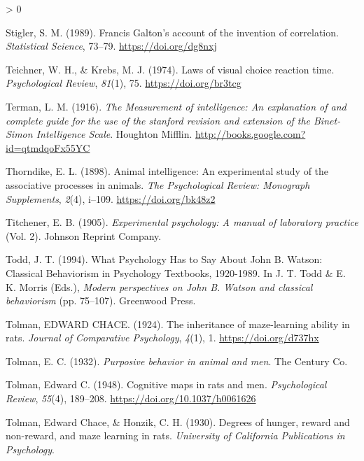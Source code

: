 \documentclass[
  oneside,
  12pt]{crumpbook}
\newlength{\cslhangindent}
\newenvironment{CSLReferences}[2] %
 {%
  \setlength{\parindent}{0pt}
  \ifodd #1 \everypar{\setlength{\hangindent}{\cslhangindent}}\ignorespaces\fi
  \ifnum #2 > 0
  \setlength{\parskip}{#2\baselineskip}
  \fi
 }%
 {}
\begin{document}
\begin{CSLReferences}{1}{0}
\leavevmode\hypertarget{ref-stiglerFrancisGaltonAccount1989}{}%
Stigler, S. M. (1989). Francis {Galton}'s account of the invention of correlation. \emph{Statistical Science}, 73--79. \url{https://doi.org/dg8nxj}

\leavevmode\hypertarget{ref-teichnerLawsVisualChoice1974}{}%
Teichner, W. H., \& Krebs, M. J. (1974). Laws of visual choice reaction time. \emph{Psychological Review}, \emph{81}(1), 75. \url{https://doi.org/br3tcg}

\leavevmode\hypertarget{ref-termanMeasurementIntelligenceExplanation1916}{}%
Terman, L. M. (1916). \emph{The {Measurement} of intelligence: {An} explanation of and complete guide for the use of the stanford revision and extension of the {Binet}-{Simon Intelligence Scale}}. {Houghton Mifflin}. \url{http://books.google.com?id=qtmdqoFx55YC}

\leavevmode\hypertarget{ref-thorndikeAnimalIntelligenceExperimental1898}{}%
Thorndike, E. L. (1898). Animal intelligence: {An} experimental study of the associative processes in animals. \emph{The Psychological Review: Monograph Supplements}, \emph{2}(4), i--109. \url{https://doi.org/bk48z2}

\leavevmode\hypertarget{ref-titchenerExperimentalPsychologyManual1905}{}%
Titchener, E. B. (1905). \emph{Experimental psychology: {A} manual of laboratory practice} (Vol. 2). {Johnson Reprint Company}.

\leavevmode\hypertarget{ref-toddWhatPsychologyHas1994}{}%
Todd, J. T. (1994). What {Psychology Has} to {Say About John B}. {Watson}: {Classical Behaviorism} in {Psychology Textbooks}, 1920-1989. In J. T. Todd \& E. K. Morris (Eds.), \emph{Modern perspectives on {John B}. {Watson} and classical behaviorism} (pp. 75--107). {Greenwood Press}.

\leavevmode\hypertarget{ref-tolmanInheritanceMazelearningAbility1924}{}%
Tolman, EDWARD CHACE. (1924). The inheritance of maze-learning ability in rats. \emph{Journal of Comparative Psychology}, \emph{4}(1), 1. \url{https://doi.org/d737hx}

\leavevmode\hypertarget{ref-tolmanPurposiveBehaviorAnimal1932}{}%
Tolman, E. C. (1932). \emph{Purposive behavior in animal and men}. {The Century Co.}

\leavevmode\hypertarget{ref-tolmanCognitiveMapsRats1948}{}%
Tolman, Edward C. (1948). Cognitive maps in rats and men. \emph{Psychological Review}, \emph{55}(4), 189--208. \url{https://doi.org/10.1037/h0061626}

\leavevmode\hypertarget{ref-tolmanDegreesHungerReward1930}{}%
Tolman, Edward Chace, \& Honzik, C. H. (1930). Degrees of hunger, reward and non-reward, and maze learning in rats. \emph{University of California Publications in Psychology}.


\end{CSLReferences}
\end{document}
